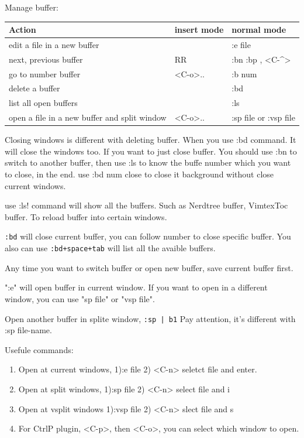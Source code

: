 \documentclass[paper=8.5in:11in, twoside, 12pt, pagesize=pdftex]{book}
\begin{document}
		Manage buffer:
		\begin{center}
			\begin{tabular}{p{}|p{}|p{}}
				\hline
				Action & insert mode & normal mode \\
				
				\hline 
				edit a file in a new buffer & &  :e file\\
				
				\hline 
				next, previous buffer & RR &  :bn :bp , <C-\^{}> \\
				
				\hline 
				go to number buffer &<C-o>.. &  :b num \\		
				
				\hline 
				delete a buffer & & :bd \\
				
				\hline 
				list all open buffers & & :ls\\
				
				\hline
				open a file in a new buffer and split window
				& <C-o>..& :sp file or :vsp file \\
				\hline 	
			\end{tabular}
		\end{center}
		
		Closing windows is different with deleting buffer. When you use :bd command. It will close the windows too. If you want to just close buffer. You should use :bn to switch to another buffer, then use :ls to know the buffe number which you want to close, in the end. use :bd num close to close it background without close current windows.
		
		use :ls! command will show all the buffers. Such as Nerdtree buffer, VimtexToc buffer. To reload buffer into certain windows. 
		
		\texttt{:bd} will close current buffer, you can follow number to close specific buffer. You also can use \texttt{:bd+space+tab} will list all the avaible buffers.
		
		Any time you want to switch buffer or open new buffer, save current buffer first.
		
		":e" will open buffer in current window. If you want to open in a different window, you can use "sp file" or "vsp file".
		
		Open another buffer in splite window, \texttt{:sp | b1} Pay attention, it's different with :sp file-name.
		
		Usefule commands:
\begin{enumerate}
	\item Open at current windows, 1):e file 2) <C-n> seletct file and enter. 
	
	\item Open at split windows, 1):sp file 2) <C-n> select file and i
	
	\item Open at vsplit windows 1):vsp file 2) <C-n> slect file and s
	
	\item For CtrlP plugin, <C-p>, then <C-o>, you can select which window to open.
\end{enumerate}		
\end{document}
